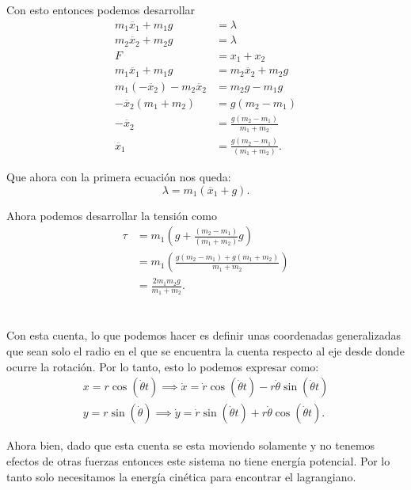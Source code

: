 \documentclass{report}
\begin{document}
Con esto entonces podemos desarrollar
\begin{align*}
  m_1\ddot{x_1} + m_1g &= \lambda \\
  m_2\ddot{x_2} + m_2g &= \lambda \\
  F &= x_1 + x_2 \\
  m_1\ddot{x_1} + m_1 g &= m_2\ddot{x_2} + m_2g \\
  m_1\left( - \ddot{x_2} \right) - m_2 \ddot{x_2} &= m_2g - m_1g  \\
  -\ddot{x_2}\left( m_1 + m_2 \right) &= g \left( m_2 - m_1 \right)  \\
  -\ddot{x_2} &= \frac{g\left( m_2 - m_1 \right) }{m_1 + m_2} \\
  \ddot{x_1} &= \frac{g\left( m_2 - m_1 \right) }{\left( m_1 + m_2 \right) }
.\end{align*}

Que ahora con la primera ecuación nos queda: \[
  \lambda = m_1\left( \ddot{x_1} + g \right)
.\] 

Ahora podemos desarrollar la tensión como
\begin{align*}
       \tau &= m_1\left( g + \frac{\left( m_2 - m_1 \right) }{\left( m_1 + m_2 \right) }g \right)  \\
       &= m_1\left( \frac{g\left( m_2 - m_1 \right) + g\left( m_1 + m_2 \right) }{m_1 + m_2} \right)  \\
       &= \frac{2m_1m_2 g}{m_1 + m_2}
.\end{align*}

\section{}

Con esta cuenta, lo que podemos hacer es definir unas coordenadas generalizadas que sean solo el radio en el que se encuentra la cuenta respecto al eje desde donde ocurre la rotación. Por lo tanto, esto lo podemos expresar como:
\begin{align*}
  x = r\cos\left( \dot{\theta}t \right) \implies \dot{x} = \dot{r}\cos\left( \dot{\theta}t \right) - r\dot{\theta}\sin\left( \dot{\theta}t \right) \\
  y = r\sin\left( \dot{\theta} \right)  \implies \dot{y} = \dot{r}\sin\left( \dot{\theta}t \right) + r\dot{\theta}\cos\left( \dot{\theta}t \right) 
.\end{align*}

Ahora bien, dado que esta cuenta se esta moviendo solamente y no tenemos efectos de otras fuerzas entonces este sistema no tiene energía potencial. Por lo tanto solo necesitamos la energía cinética para encontrar el lagrangiano.
\end{document}
